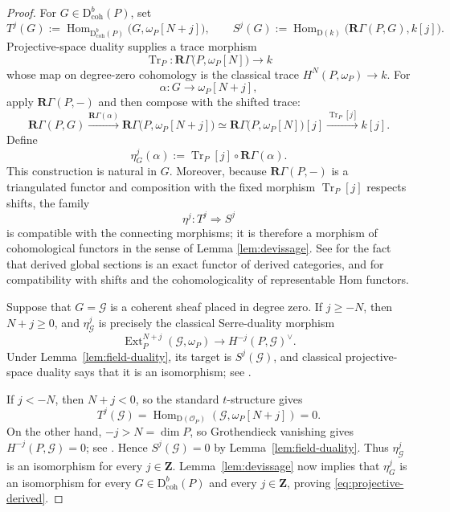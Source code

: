 \documentclass[11pt,a4paper]{article}
\theoremstyle{definition}
\theoremstyle{remark}
\newcommand{\OO}{\mathcal O}
\newcommand{\Hom}{\operatorname{Hom}}
\newcommand{\Ext}{\operatorname{Ext}}
\newcommand{\RGamma}{\mathbf R\Gamma}
\newcommand{\D}{\mathrm D}
\newcommand{\Dbcoh}{\mathrm D^b_{\mathrm{coh}}}
\begin{document}
\begin{proof}
For $G\in\Dbcoh(P)$, set
\[
  T^j(G):=\Hom_{\Dbcoh(P)}\bigl(G,\omega_P[N+j]\bigr),
  \qquad
  S^j(G):=\Hom_{\D(k)}\bigl(\RGamma(P,G),k[j]\bigr).
\]
Projective-space duality supplies a trace morphism
\[
  \operatorname{Tr}_P:
  \RGamma\bigl(P,\omega_P[N]\bigr)\longrightarrow k
\]
whose map on degree-zero cohomology is the classical trace
$H^N(P,\omega_P)\to k$. For
\[
  \alpha:G\longrightarrow\omega_P[N+j],
\]
apply $\RGamma(P,-)$ and then compose with the shifted trace:
\[
  \RGamma(P,G)
  \xrightarrow{\RGamma(\alpha)}
  \RGamma\bigl(P,\omega_P[N+j]\bigr)
  \simeq
  \RGamma\bigl(P,\omega_P[N]\bigr)[j]
  \xrightarrow{\operatorname{Tr}_P[j]}
  k[j].
\]
Define
\[
  \eta_G^j(\alpha)
  :=\operatorname{Tr}_P[j]\circ\RGamma(\alpha).
\]
This construction is natural in $G$. Moreover, because $\RGamma(P,-)$ is a
triangulated functor and composition with the fixed morphism
$\operatorname{Tr}_P[j]$ respects shifts, the family
\[
  \eta^j:T^j\Longrightarrow S^j
\]
is compatible with the connecting morphisms; it is therefore a morphism of
cohomological functors in the sense of Lemma \ref{lem:devissage}. See
\cite[Tag 071J]{Stacks} for the fact that derived global sections is an exact
functor of derived categories, and \cite[Tags 014V and 0149]{Stacks} for
compatibility with shifts and the cohomologicality of representable Hom
functors.

Suppose that $G=\mathcal G$ is a coherent sheaf placed in degree zero. If
$j\geq-N$, then $N+j\geq0$, and $\eta_{\mathcal G}^j$ is precisely the
classical Serre-duality morphism
\[
  \Ext_P^{N+j}(\mathcal G,\omega_P)
  \longrightarrow H^{-j}(P,\mathcal G)^\vee.
\]
Under Lemma~\ref{lem:field-duality}, its target is
$S^j(\mathcal G)$, and classical projective-space duality says that it is an
isomorphism; see \cite[Chapter III, Theorem 7.1]{HartshorneAG}.

If $j<-N$, then $N+j<0$, so the standard $t$-structure gives
\[
  T^j(\mathcal G)
  =\Hom_{\D(\OO_P)}(\mathcal G,\omega_P[N+j])=0.
\]
On the other hand, $-j>N=\dim P$, so Grothendieck vanishing gives
$H^{-j}(P,\mathcal G)=0$; see
\cite[Chapter III, Theorem 2.7]{HartshorneAG}. Hence $S^j(\mathcal G)=0$ by
Lemma~\ref{lem:field-duality}. Thus $\eta_{\mathcal G}^j$ is an isomorphism
for every $j\in\mathbf Z$. Lemma~\ref{lem:devissage} now implies that
$\eta_G^j$ is an isomorphism for every $G\in\Dbcoh(P)$ and every
$j\in\mathbf Z$, proving \eqref{eq:projective-derived}.
\end{proof}
\end{document}

